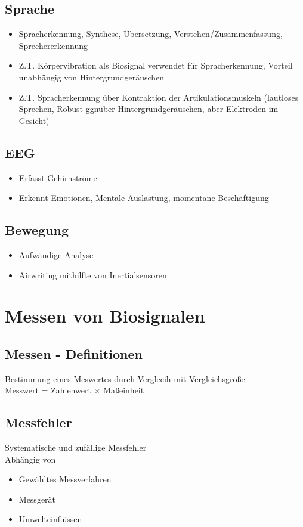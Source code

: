 \documentclass[a4paper,10pt,oneside]{article}
\begin{document}
\subsection{Sprache}
\begin{itemize}
	\item Spracherkennung, Synthese, Übersetzung, Verstehen/Zusammenfassung, Sprechererkennung
	\item Z.T. Körpervibration als Biosignal verwendet für Spracherkennung, Vorteil unabhängig von Hintergrundgeräuschen
	\item Z.T. Spracherkennung über Kontraktion der Artikulationsmuskeln (lautloses Sprechen, Robust ggnüber Hintergrundgeräuschen, aber Elektroden im Gesicht)
\end{itemize}

\subsection{EEG}
\begin{itemize}
	\item Erfasst Gehirnströme
	\item Erkennt Emotionen, Mentale Auslastung, momentane Beschäftigung
\end{itemize}

\subsection{Bewegung}
\begin{itemize}
	\item Aufwändige Analyse
	\item Airwriting mithilfte von Inertialsensoren
\end{itemize}

\section{Messen von Biosignalen}
\subsection{Messen - Definitionen}
Bestimmung eines Meswertes durch Verglecih mit Vergleichsgröße \\
Messwert = Zahlenwert $\times$ Maßeinheit

\subsection{Messfehler}
Systematische und zufällige Messfehler \\
Abhängig von
\begin{itemize}
	\item Gewähltes Messverfahren
	\item Messgerät
	\item Umwelteinflüssen
\end{itemize}
\end{document}
